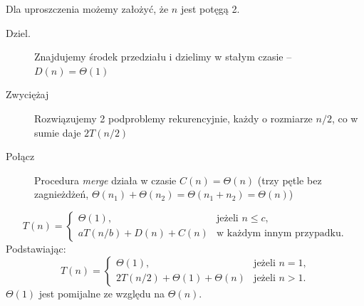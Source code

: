 \documentclass[10pt, oneside]{article}
\theoremstyle{remark}
\begin{document}
Dla uproszczenia możemy założyć, że $n$ jest potęgą 2.

\begin{description}
	\item[Dziel.] Znajdujemy środek przedziału i dzielimy w stałym czasie -- $D(n) = \Theta (1)$
	\item[Zwyciężaj] Rozwiązujemy 2 podproblemy rekurencyjnie, każdy o rozmiarze $n/2$, co w sumie daje $2T(n/2)$
	\item[Połącz] Procedura \emph{merge} działa w czasie $C(n)=\Theta(n)$ (trzy pętle bez zagnieżdżeń, $\Theta(n_1) + \Theta(n_2) = \Theta(n_1 + n_2) = \Theta(n)$)
\end{description}

\begin{equation*}
T(n) = \begin{cases}
\Theta(1), &\text{jeżeli $n \leq c $,}\\
aT(n/b) + D(n) + C(n) & \text{w każdym innym przypadku}.
\end{cases}
\end{equation*}
Podstawiając:
\begin{equation*}
T(n) = \begin{cases}
\Theta(1), &\text{jeżeli $n  = 1 $,}\\
2T(n/2) + \Theta(1) + \Theta(n) & \text{jeżeli $n > 1$}.
\end{cases}
\end{equation*}
$\Theta(1)$ jest pomijalne ze względu na $\Theta(n)$.
\end{document}
